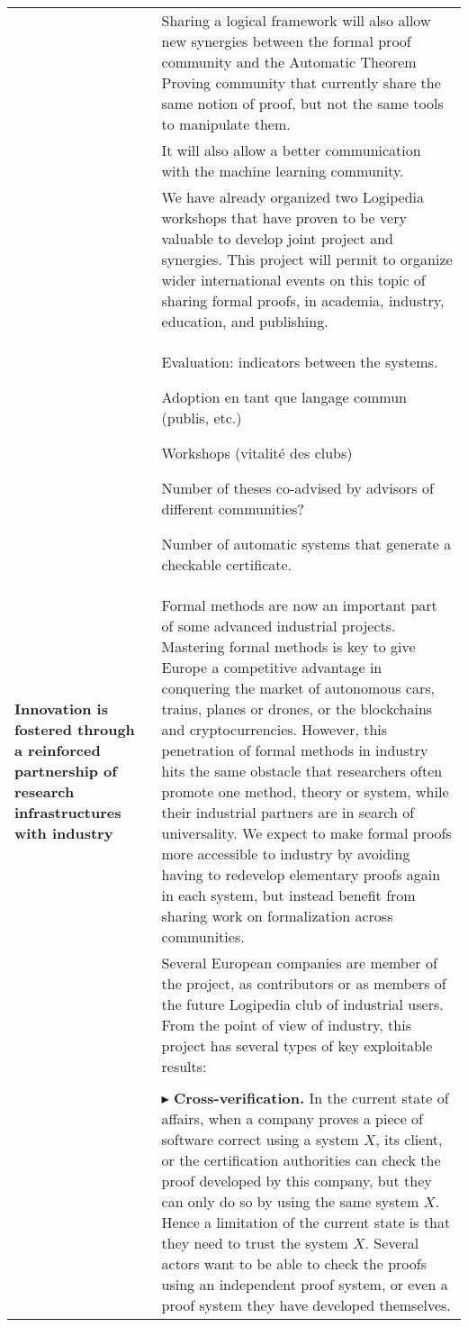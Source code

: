 \begin{longtable}{|p{}|p{}|}
&
\hspace{0.4cm}
Sharing a logical framework will also allow new synergies between the
formal proof community and the Automatic Theorem Proving community
that currently share the same notion of proof, but not the same tools
to manipulate them.
\\
&
\hspace{0.4cm}
It will also allow a better communication with the machine learning community.\\
&
\hspace{0.4cm}
We have already organized two Logipedia workshops that have proven to
be very valuable to develop joint project and synergies.  This project
will permit to organize wider international events on this topic of
sharing formal proofs, in academia, industry, education, and
publishing.\\

&\begin{framed}
   Evaluation: indicators between the systems.

   Adoption en tant que langage commun (publis, etc.)

   Workshops (vitalité des clubs)

   Number of theses co-advised by advisors of different communities?

   Number of automatic systems that generate a checkable certificate.
 \end{framed}
\\

\hline
{\bf Innovation is fostered through a reinforced partnership of
research infrastructures with industry}
&
Formal methods are now an important part of some advanced industrial
projects. Mastering formal methods is key to give Europe a competitive
advantage in conquering the market of autonomous cars, trains, planes
or drones, or the blockchains and cryptocurrencies. However, this
penetration of formal methods in industry hits the same obstacle that
researchers often promote one method, theory or system, while their
industrial partners are in search of universality. We expect to make
formal proofs more accessible to industry by avoiding having to redevelop
elementary proofs again in each system, but instead benefit from
sharing work on formalization across communities.\\
&
\hspace{0.4cm}
Several European companies are member of the project,
as contributors or as members of the future Logipedia club of
industrial users.  From the point of view of industry, this
project has several types of key exploitable results:\\
&\\
&
$\blacktriangleright$
{\bf Cross-verification.}
In the current state of affairs, when a company proves a piece of
software correct using a system $X$, its client, or the certification
authorities can check the proof developed by this company, but they
can only do so by using the same system $X$. Hence a limitation of
the current state is that they need to trust the system $X$.
Several actors want to be able to check the proofs using an
independent proof system, or even a proof system they have developed
themselves.


\end{longtable}
